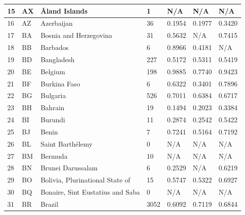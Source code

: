 \documentclass{article}
\begin{document}
\begin{table}
\begin{longtable}{|l|l|l|l|l|l|l|}
15  & AX           & Åland Islands                                        & 1     & N/A    & N/A    & N/A    \\ \hline
16  & AZ           & Azerbaijan                                           & 36    & 0.1954 & 0.1977 & 0.3420 \\ \hline
17  & BA           & Bosnia and Herzegovina                               & 31    & 0.5632 & N/A    & 0.7415 \\ \hline
18  & BB           & Barbados                                             & 6     & 0.8966 & 0.4181 & N/A    \\ \hline
19  & BD           & Bangladesh                                           & 227   & 0.5172 & 0.5311 & 0.5419 \\ \hline
20  & BE           & Belgium                                              & 198   & 0.9885 & 0.7740 & 0.9423 \\ \hline
21  & BF           & Burkina Faso                                         & 6     & 0.6322 & 0.3401 & 0.7896 \\ \hline
22  & BG           & Bulgaria                                             & 526   & 0.7011 & 0.6384 & 0.6717 \\ \hline
23  & BH           & Bahrain                                              & 19    & 0.1494 & 0.2023 & 0.3384 \\ \hline
24  & BI           & Burundi                                              & 11    & 0.2874 & 0.2542 & 0.5422 \\ \hline
25  & BJ           & Benin                                                & 7     & 0.7241 & 0.5164 & 0.7192 \\ \hline
26  & BL           & Saint Barthélemy                                     & 0     & N/A    & N/A    & N/A    \\ \hline
27  & BM           & Bermuda                                              & 10    & N/A    & N/A    & N/A    \\ \hline
28  & BN           & Brunei Darussalam                                    & 6     & 0.2529 & N/A    & 0.6219 \\ \hline
29  & BO           & Bolivia, Plurinational State of                      & 15    & 0.5747 & 0.5322 & 0.6927 \\ \hline
30  & BQ           & Bonaire, Sint Eustatius and Saba                     & 0     & N/A    & N/A    & N/A    \\ \hline
31  & BR           & Brazil                                               & 3052  & 0.6092 & 0.7119 & 0.6844 \\ \hline

\end{longtable}
\end{table}
\end{document}
